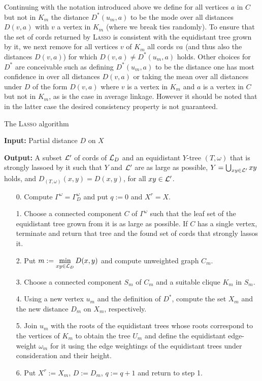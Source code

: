 Continuing with the notation introduced above we define for all vertices $a$
in $C$ but not in $K_m$ the distance $D^*(u_m,a)$ to be the mode over all
distances $D(v,a)$ with $v$ a vertex in $K_m$ (where we break ties randomly).
To ensure that the set of cords returned by \textsc{Lasso} is consistent with the
equidistant tree grown by it, we next remove for all vertices $v$ of $K_m$ all
cords $va$ (and thus also the distances $D(v,a)$) for which
$D(v,a)\not=D^*(u_m,a)$ holds.  Other choices for $D^*$ are conceivable such
as defining $D^*(u_m,a)$ to be the distance one has most confidence in over
all distances $D(v,a)$ or taking the mean over all distances under $D$ of the
form $D(v,a)$ where $v$ is a vertex in $K_m$ and $a$ is a vertex in $C$ but
not in $K_m$, as is the case in average linkage. However it should be noted
that in the latter case the desired consistency property is not guaranteed.

\begin{algorithm}
  \caption{The \textsc{Lasso} algorithm}
  \label{alg:lasso}
  \textbf{Input:} Partial distance $D$ on $X$ 

  \textbf{Output:} A subset ${\mathcal L}'$ of cords of ${\mathcal L}_D$ and an equidistant
  $Y$-tree $(T,\omega)$ that is strongly lassoed by it such that $Y$ and
  ${\mathcal L}'$ are as large as possible, $Y=\bigcup_{xy\in {\mathcal L}'}xy$ holds, and
  $D_{(T,\omega)}(x,y) = D(x,y)$, for all $xy \in {\mathcal L}'$.

  \begin{itemize}
  \item[0.] Compute $\Gamma^{\omega} =\Gamma^{\omega}_D$ and put $q := 0$
and $X^r=X$.
  \item[1.] Choose a connected component $C$ of  $\Gamma^{\omega}$ 
such that the leaf set of the equidistant tree grown from it is as 
large as possible.  If $C$ has a single vertex, terminate 
and return that tree and the found set of cords that strongly lassos it.
  \item[2.] Put $\displaystyle m := \min_{xy \in {\mathcal L}_D} D(x,y)$
and compute unweighted graph $C_m$. 
  \item[3.] Choose a connected component $S_m$ of $C_m$ and a suitable
clique $K_m$ in $S_m$.
\item[4.] Using a new vertex $u_m$ and the definition of $D^*$,
compute the set $X_m$ and the new distance $D_m$ on $X_m$, respectively. 
  \item[5.] Join $u_m$ with the roots of the equidistant trees 
whose roots correspond to the vertices of $K_m$ to obtain the tree $U_m$
and define the equidistant edge-weight $\omega_m$ for it using the edge
weightings of the equidistant trees under consideration and their 
height. 
  \item[6.] 
    Put $X^r:=X_m$, $D:=D_m$, $q := q+1$ and return to
    step 1.
  \end{itemize}
\end{algorithm}

